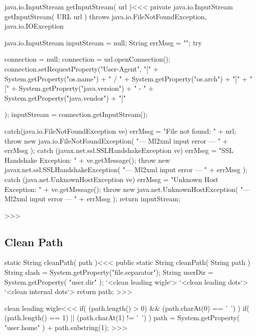 \documentclass{article}
\begin{document}
\<java.io.InputStream getInputStream( url )\><<<   
private java.io.InputStream getInputStream( URL url )
                            throws java.io.FileNotFoundException,
                                             java.io.IOException {
   java.io.InputStream inputStream = null;
   String errMssg = "";
   try{
      connection = null;
      connection = url.openConnection();
      connection.setRequestProperty("User-Agent",
                      "["
                    + System.getProperty("os.name")
                    + " / "
                    + System.getProperty("os.arch")
                    + "]"
                    + "["
                    + System.getProperty("java.version")
                    + " - "
                    + System.getProperty("java.vendor")
                    + "]"

           );
      inputStream = connection.getInputStream();
   } catch(java.io.FileNotFoundException ve){
      errMssg = "File not found: " + url;
      throw new java.io.FileNotFoundException(
                 "--- Ml2xml input error --- " + errMssg );
   } catch (javax.net.ssl.SSLHandshakeException ve){
      errMssg = "SSL Handshake Exception: " + ve.getMessage();
      throw new javax.net.ssl.SSLHandshakeException(
                 "--- Ml2xml input error --- " + errMssg );
   } catch (java.net.UnknownHostException ve){
      errMssg = "Unknown Host Exception: " + ve.getMessage();
      throw new java.net.UnknownHostException(
                   "--- Ml2xml input error --- " + errMssg );
   }
   return inputStream;
}
>>>



\subsection{Clean Path}


 
\<static String cleanPath( path )\><<< 
public static String cleanPath( String path ){ 
     String slash = System.getProperty("file.separator");
     String userDir = System.getProperty( "user.dir" );
  `<clean leading wigle`>
  `<clean leading dots`>
  `<clean internal dots`>
  return path; 
} 
>>> 

\<clean leading wigle\><<< 
  if( (path.length() > 0) && (path.charAt(0) == '~') ){  
    if( (path.length() == 1) || (path.charAt(1) != '~') ){  
      path = System.getProperty( "user.home" ) 
                             + path.substring(1);  
  } } 
>>>
\end{document}
